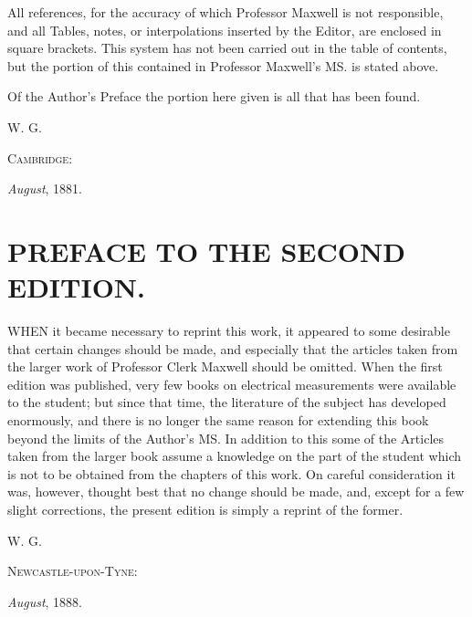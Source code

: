 \documentclass[12pt,oneside]{book}[2021/10/04]
\newcommand{\Heading}{\centering\normalfont}
\newcommand{\Chapter}[1]{\section*{\large\Heading #1}}
\newcommand{\singleline}{
  \hspace*{0.33\textwidth}{\rule{0.33\textwidth}{0.4pt}}
}
\newcommand{\¬}{\hphantom{0}}
\begin{document}
All references, for the accuracy of which Professor Maxwell
is not responsible, and all Tables, notes, or interpolations inserted
by the Editor, are enclosed in square brackets. This
system has not been carried out in the table of contents, but
the portion of this contained in Professor Maxwell's MS. is
stated above.

Of the Author's Preface the portion here given is all that
has been found.

\hspace*{\fill}
W. G.
\hspace{1cm}

\small
\hspace{1cm}\textsc{Cambridge:}

\hspace{2cm}\textit{August}, 1881.
\normalsize

\vspace{1cm}
\singleline
\vspace{1cm}

\Chapter{PREFACE TO THE SECOND EDITION.}

\lettrine[lines=2, findent=0pt, loversize=0.1]{W}{HEN} it became necessary to reprint this work, it appeared
to some desirable that certain changes should be made,
and especially that the articles taken from the larger work of
Professor Clerk Maxwell should be omitted. When the first
edition was published, very few books on electrical measurements
were available to the student; but since that time, the literature
of the subject has developed enormously, and there is no longer
the same reason for extending this book beyond the limits of
the Author's MS\@. In addition to this some of the Articles taken
from the larger book assume a knowledge on the part of the
student which is not to be obtained from the chapters of this
work. On careful consideration it was, however, thought best
that no change should be made, and, except for a few slight corrections,
the present edition is simply a reprint of the former.

\hspace*{\fill}
W. G.
\hspace{1cm}

\small
\hspace{1cm}\textsc{Newcastle-upon-Tyne}:

\hspace{2cm}\textit{August}, 1888.

\vspace{1cm}
\singleline
\vspace{1cm}
\normalsize
\end{document}
